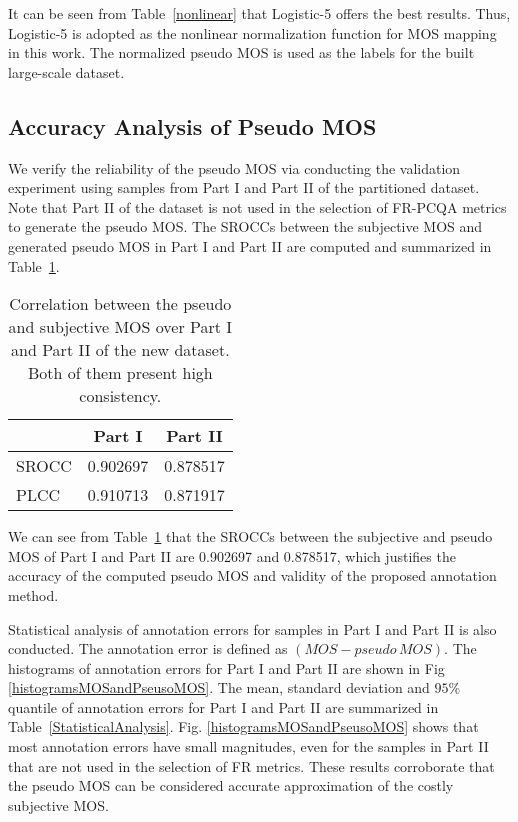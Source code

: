\documentclass[acmsmall]{acmart}
\begin{document}
\par It can be seen from Table~\ref{nonlinear} that Logistic-5 offers the best results. Thus, Logistic-5 is adopted as the nonlinear normalization function for MOS mapping in this work. The normalized pseudo MOS is used as the labels for the built large-scale dataset.





\subsection{Accuracy Analysis of Pseudo MOS} \label{sec:accuracyverification}

\par We verify the reliability of the pseudo MOS via conducting the validation experiment using samples from Part I and Part II of the partitioned dataset. Note that Part II of the dataset is not used in the selection of FR-PCQA metrics to generate the pseudo MOS. The SROCCs between the subjective MOS and generated pseudo MOS in Part I and Part II are computed and summarized in Table~\ref{pseudoverification}.

\begin{table}[htbp]
  \centering
  \caption{Correlation between the pseudo and subjective MOS over Part I and Part II of the new dataset. Both of them present high consistency.}
  \begin{footnotesize}
    \begin{tabular}{l|cc}
    \hline
          & Part I & Part II \\
    \hline
    SROCC & 0.902697 & 0.878517 \\
    PLCC  & 0.910713 & 0.871917 \\
    \hline
    \end{tabular}\end{footnotesize}
  \label{pseudoverification}\end{table}

\par We can see from Table~\ref{pseudoverification} that the SROCCs between the subjective and pseudo MOS of Part I and Part II are 0.902697 and 0.878517, which justifies the accuracy of the computed pseudo MOS and validity of the proposed annotation method.

\par Statistical analysis of annotation errors for samples in Part I and Part II is also conducted. The annotation error is defined as $(MOS - pseudo \, MOS)$. The histograms of annotation errors for Part I and Part II are shown in Fig \ref{histogramsMOSandPseusoMOS}. The mean, standard deviation and $95\%$ quantile of annotation errors for Part I and Part II are summarized in Table~\ref{StatisticalAnalysis}. Fig. \ref{histogramsMOSandPseusoMOS} shows that most annotation errors have small magnitudes, even for the samples in Part II that are not used in the selection of FR metrics. These results corroborate that the pseudo MOS can be considered accurate approximation of the costly subjective MOS.
\end{document}
